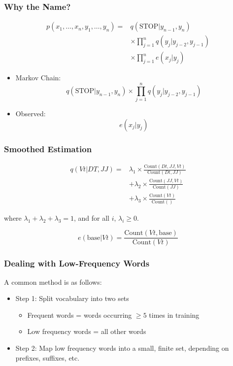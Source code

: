 \documentclass[handout]{beamer}
\begin{document}
\begin{frame}
  \frametitle{Why the Name?}
\[
\begin{aligned}
p(x_1, \ldots, x_n, y_1, \ldots, y_n) = & q(\text{STOP}|y_{n-1}, y_n) \\
& \times \prod_{j=1}^{n} q(y_j | y_{j-2}, y_{j-1}) \\
& \times \prod_{j=1}^{n} e(x_j | y_j)
\end{aligned}
\]
  \begin{itemize}
    \item Markov Chain:
    \[
      q(\text{STOP}|y_{n-1}, y_n)\times \prod_{j=1}^{n} q(y_j | y_{j-2}, y_{j-1})
    \]
    \item Observed:
    \[
      e(x_j | y_j)
    \]
  \end{itemize}
\end{frame}



\begin{frame}
\frametitle{Smoothed Estimation}

\[
\begin{aligned}
q(Vt | DT, JJ) = & \lambda_1 \times \frac{{\text{Count}(Dt, JJ, Vt)}}{{\text{Count}(Dt, JJ)}} \\
& + \lambda_2 \times \frac{{\text{Count}(JJ, Vt)}}{{\text{Count}(JJ)}} \\
& + \lambda_3 \times \frac{{\text{Count}(Vt)}}{{\text{Count}()}}
\end{aligned}
\]

where $\lambda_1 + \lambda_2 + \lambda_3 = 1$, and for all $i$, $\lambda_i \geq 0$.

\vspace{0.5cm}

\[
e(\text{base} | Vt) = \frac{{\text{Count}(Vt, \text{base})}}{{\text{Count}(Vt)}}
\]

\end{frame}

\begin{frame}
\frametitle{Dealing with Low-Frequency Words}

A common method is as follows:
\begin{itemize}
  \item Step 1: Split vocabulary into two sets
    \begin{itemize}
      \item Frequent words = words occurring $\geq 5$ times in training
      \item Low frequency words = all other words
    \end{itemize}
  \item Step 2: Map low frequency words into a small, finite set, depending on prefixes, suffixes, etc.
\end{itemize}

\end{frame}
\end{document}

